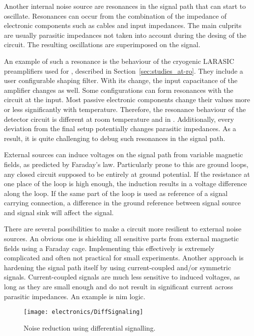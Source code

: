 Another internal noise source are resonances in the signal path that can start to oscillate.
Resonances can occur from the combination of the impedance of electronic components such as cables and input impedances.
The main culprits are usually parasitic impedances not taken into account during the desing of the circuit.
The resulting oscillations are superimposed on the signal.

An example of such a resonance is the behaviour of the cryogenic LARASIC preamplifiers used for \AT{}, described in Section~\ref{sec:studies_at-ro}.
They include a user configurable shaping filter.
With its change, the input capacitance of the amplifier changes as well.
Some configurations can form resonances with the circuit at the input.
Most passive electronic components change their values more or less significantly with temperature.
Therefore, the resonance behaviour of the detector circuit is different at room temperature and in \lar{}.
Additionally, every deviation from the final setup potentially changes parasitic impedances.
As a result, it is quite challenging to debug such resonances in the signal path.

External sources can induce voltages on the signal path from variable magnetic fields, as predicted by Faraday's law.
Particularly prone to this are ground loops, any closed circuit supposed to be entirely at ground potential.
If the resistance at one place of the loop is high enough, the induction results in a voltage difference along the loop.
If the same part of the loop is used as reference of a signal carrying connection, a difference in the ground reference between signal source and signal sink will affect the signal.

There are several possibilities to make a circuit more resilient to external noise sources.
An obvious one is shielding all sensitive parts from external magnetic fields using a Faraday cage.
Implementing this effectively is extremely complicated and often not practical for small experiments.
Another approach is hardening the signal path itself by using current-coupled and/or symmetric signals.
Current-coupled signals are much less sensitive to induced voltages, as long as they are small enough and do not result in significant current across parasitic impedances.
An example is \gls{nim} logic.

\begin{figure}[htb]
	\centering
	\texttt{[image: electronics/DiffSignaling]}
	\caption[Differential signalling]{%
		Noise reduction using differential signalling.~\cite{diff_signal}
	}
	\label{fig:electronics_diff-signal}
\end{figure}

